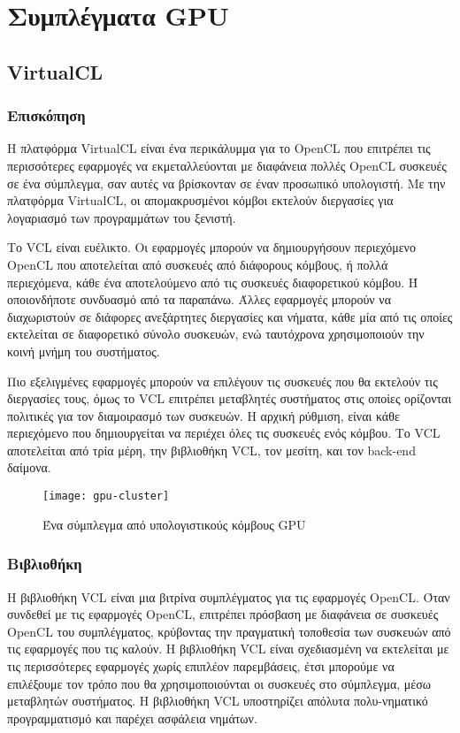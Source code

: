 \section{Συμπλέγματα GPU}

\subsection{VirtualCL}
\subsubsection{Επισκόπηση}
Η πλατφόρμα VirtualCL είναι ένα περικάλυμμα για το OpenCL που επιτρέπει τις περισσότερες εφαρμογές να εκμεταλλεύονται με διαφάνεια πολλές OpenCL συσκευές σε ένα σύμπλεγμα, σαν αυτές να βρίσκονταν σε έναν προσωπικό υπολογιστή. Με την πλατφόρμα VirtualCL, οι απομακρυσμένοι κόμβοι εκτελούν διεργασίες για λογαριασμό των προγραμμάτων του ξενιστή.\cite{virtualcl-6}

Το VCL είναι ευέλικτο. Οι εφαρμογές μπορούν να δημιουργήσουν περιεχόμενο OpenCL που αποτελείται από συσκευές από διάφορους κόμβους, ή πολλά περιεχόμενα, κάθε ένα αποτελούμενο από τις συσκευές διαφορετικού κόμβου. Ή οποιονδήποτε συνδυασμό από τα παραπάνω. Άλλες εφαρμογές μπορούν να διαχωριστούν σε διάφορες ανεξάρτητες διεργασίες και νήματα, κάθε μία από τις οποίες εκτελείται σε διαφορετικό σύνολο συσκευών, ενώ ταυτόχρονα χρησιμοποιούν την κοινή μνήμη του συστήματος. 

Πιο εξελιγμένες εφαρμογές μπορούν να επιλέγουν τις συσκευές που θα εκτελούν τις διεργασίες τους, όμως το VCL επιτρέπει μεταβλητές συστήματος στις οποίες ορίζονται πολιτικές για τον διαμοιρασμό των συσκευών. Η αρχική ρύθμιση, είναι κάθε περιεχόμενο που δημιουργείται να περιέχει όλες τις συσκευές ενός κόμβου. Το VCL αποτελείται από τρία μέρη, την βιβλιοθήκη VCL, τον μεσίτη, και τον back-end δαίμονα. \cite{virtualcl-1}

\begin{figure}[h]
	\texttt{[image: gpu-cluster]}
	\centering
	\caption{Ένα σύμπλεγμα από υπολογιστικούς κόμβους GPU}
\end{figure}

\subsubsection{Βιβλιοθήκη}
Η βιβλιοθήκη VCL είναι μια βιτρίνα συμπλέγματος για τις εφαρμογές OpenCL. Όταν συνδεθεί με τις εφαρμογές OpenCL, επιτρέπει πρόσβαση με διαφάνεια σε συσκευές OpenCL του συμπλέγματος, κρύβοντας την πραγματική τοποθεσία των συσκευών από τις εφαρμογές που τις καλούν. Η βιβλιοθήκη VCL είναι σχεδιασμένη να εκτελείται με τις περισσότερες εφαρμογές χωρίς επιπλέον παρεμβάσεις, έτσι μπορούμε να επιλέξουμε τον τρόπο που θα χρησιμοποιούνται οι συσκευές στο σύμπλεγμα, μέσω μεταβλητών συστήματος. Η βιβλιοθήκη VCL υποστηρίζει απόλυτα πολυ-νηματικό προγραμματισμό και παρέχει ασφάλεια νημάτων.\cite{virtualcl-2}

